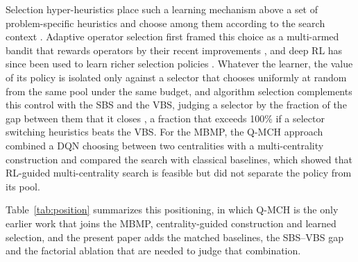 \documentclass[runningheads]{llncs}
\begin{document}
Selection hyper-heuristics place such a learning mechanism above a set of problem-specific heuristics and choose among them according to the search context \cite{burke2013,drake2020}. Adaptive operator selection first framed this choice as a multi-armed bandit that rewards operators by their recent improvements \cite{fialho2010,auer2002}, and deep RL has since been used to learn richer selection policies \cite{mazyavkina2021,zhang2022,kallestad2023}. Whatever the learner, the value of its policy is isolated only against a selector that chooses uniformly at random from the same pool under the same budget, and algorithm selection complements this control with the SBS and the VBS, judging a selector by the fraction of the gap between them that it closes \cite{kerschke2019}, a fraction that exceeds 100\% if a selector switching heuristics beats the VBS. For the MBMP, the Q-MCH approach \cite{carneiro2024qmch} combined a DQN choosing between two centralities with a multi-centrality construction and compared the search with classical baselines, which showed that RL-guided multi-centrality search is feasible but did not separate the policy from its pool.

Table~\ref{tab:position} summarizes this positioning, in which Q-MCH is the only earlier work that joins the MBMP, centrality-guided construction and learned selection, and the present paper adds the matched baselines, the SBS--VBS gap and the factorial ablation that are needed to judge that combination.
\end{document}
